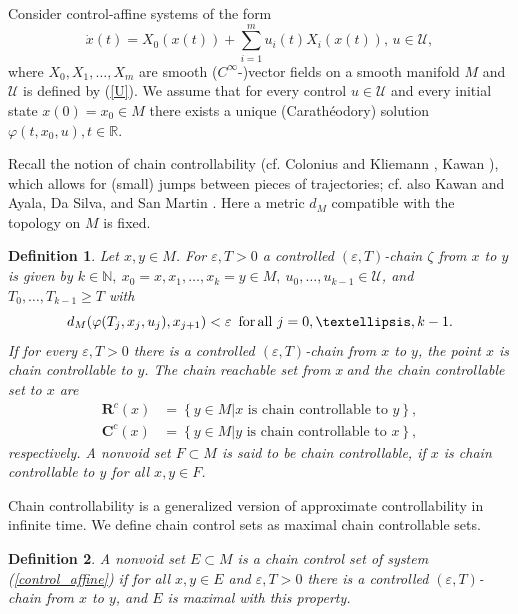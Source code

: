 \documentclass[preprint,12pt]{elsarticle}
\newtheorem{definition}{Definition}
\begin{document}
Consider control-affine systems of the form
\begin{equation}
\dot{x}(t)=X_{0}(x(t))+\sum_{i=1}^{m}u_{i}(t)X_{i}(x(t)),\,u\in\mathcal{U},
\label{control_affine}%
\end{equation}
where $X_{0},X_{1},\ldots,X_{m}$ are smooth ($C^{\infty}$-)vector fields on a
smooth manifold $M$ and $\mathcal{U}$ is defined by (\ref{U}). We assume that
for every control $u\in\mathcal{U}$ and every initial state $x(0)=x_{0}\in M$
there exists a unique (Carath\'{e}odory) solution $\varphi(t,x_{0}%
,u),t\in\mathbb{R}$.

Recall the notion of chain controllability (cf. Colonius and Kliemann \cite[p.
80]{ColK00}, Kawan \cite[Definition 1.14]{Kawa13}), which allows for (small)
jumps between pieces of trajectories; cf. also Kawan \cite{Kawa16} and Ayala,
Da Silva, and San Martin \cite{AyDSSM17}. Here a metric $d_{M}$ compatible
with the topology on $M$ is fixed.

\begin{definition}
\label{intro2:defchains}Let $x,y\in M$. For $\varepsilon,T>0$ a controlled
$(\varepsilon,T)$\textit{-chain} $\zeta$ from $x$ to $y$ is given by
$k\in\mathbb{N},\ x_{0}=x,x_{1},\ldots,x_{k}=y\in M,\ u_{0},\ldots,u_{k-1}%
\in\mathcal{U}$, and $T_{0},\ldots,T_{k-1}\geq T$ with
\[
d_{M}(\varphi(T_{j},x_{j},u_{j}),x_{j+1})<\varepsilon\text{ }%
\,\text{for\thinspace all}\,\,j=0,\ldots,k-1.
\]
If for every $\varepsilon,T>0$ there is a controlled $(\varepsilon,T)$-chain
from $x$ to $y$, the point $x$ is chain controllable to $y$. The chain
reachable set from $x\ $and the chain controllable set to $x$ are
\begin{align*}
\mathbf{R}^{c}(x)  &  =\left\{  y\in M\left\vert x\text{ is chain controllable
to }y\right.  \right\}  ,\\
\mathbf{C}^{c}(x)  &  =\left\{  y\in M\left\vert y\text{ is chain controllable
to }x\right.  \right\}  ,
\end{align*}
respectively. A nonvoid set $F\subset M$ is said to be chain controllable, if
$x$ is chain controllable to $y$ for all $x,y\in F$.
\end{definition}

Chain controllability is a generalized version of approximate controllability
in infinite time. We define chain control sets as maximal chain controllable sets.

\begin{definition}
\label{Definition_chain_control}A nonvoid set $E\subset M$ is a \textit{chain
control set} of system (\ref{control_affine}) if for all $x,y\in E$ and
$\varepsilon,T>0$ there is a controlled $(\varepsilon,T)$-chain from $x$ to
$y$, and $E$ is maximal with this property.
\end{definition}
\end{document}
